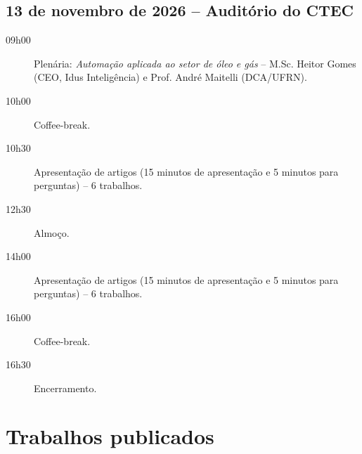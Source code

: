 \documentclass[12pt,a4paper,oneside,openany]{book}
\newcommand{\Autor}[1]{\index[autores]{#1}}
\newcommand{\Artigo}[3]{%
  }
\begin{document}
\section*{13 de novembro de 2026 -- Auditório do CTEC}
\begin{description}
  \item[09h00] Plenária: \textit{Automação aplicada ao setor de óleo e gás} -- M.Sc. Heitor Gomes (CEO, Idus Inteligência) e Prof. André Maitelli (DCA/UFRN).
  \item[10h00] Coffee-break.
  \item[10h30] Apresentação de artigos (15 minutos de apresentação e 5 minutos para perguntas) -- 6 trabalhos.
  \item[12h30] Almoço.
  \item[14h00] Apresentação de artigos (15 minutos de apresentação e 5 minutos para perguntas) -- 6 trabalhos.
  \item[16h00] Coffee-break.
  \item[16h30] Encerramento.
\end{description}

\tableofcontents
\mainmatter

\chapter*{Trabalhos publicados}

\Artigo{01_estudos_preliminares_para_o_desenvolvimento_de_uma_arquitetura_modular_baseada_em_ia_para_interacao_com_sistemas_de_gestao_de_malhas_de_controle}
{Estudos preliminares para o desenvolvimento de uma arquitetura modular baseada em IA para interação com sistemas de gestão de malhas de controle}
{\Autor{Ana Sophia Diógenes Soares}\Autor{Fernando Eduardo Dias}\Autor{Fábio Meneghetti Ugulino de Araujo}}

\Artigo{02_sistema_de_inspecao_visual_automatizada_para_controle_de_qualidade_em_pecas_fabricadas}
{Sistema de inspeção visual automatizada para controle de qualidade em peças fabricadas}
{\Autor{Israel Lucas}}

\Artigo{03_analise_teorica_e_experimental_da_resposta_de_um_gerador_sincrono_a_insercao_de_um_degrau_de_carga}
{Análise teórica e experimental da resposta de um gerador síncrono à inserção de um degrau de carga}
{\Autor{Levi da Silva Lopes}\Autor{José Higor Rodrigues Soares}\Autor{Rodrigo Prado de Medeiros}\Autor{Thiago de Oliveira Alves Rocha}\Autor{Ricardo Lúcio de Araújo Ribeiro}\Autor{José Patrocínio da Silva}}
\end{document}
